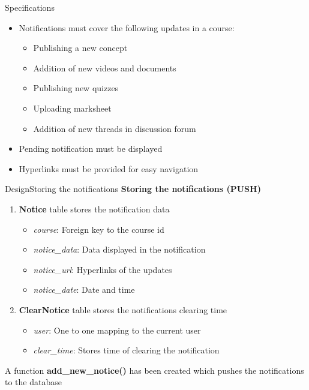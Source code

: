 \documentclass[xcolor=table]{beamer}
\begin{document}
\begin{frame}{Specifications}
	\begin{itemize}
		\item Notifications must cover the following updates in a course:
		\begin{itemize}
			\item Publishing a new concept
			\item Addition of new videos and documents
			\item Publishing new quizzes
			\item Uploading marksheet
			\item Addition of new threads in discussion forum
		\end{itemize}
		\item Pending notification must be displayed
		\item Hyperlinks must be provided for easy navigation
	\end{itemize}
\end{frame}

\begin{frame}{Design}{Storing the notifications}
	\textbf{Storing the notifications (PUSH)}
	\begin{enumerate}
		\item \textbf{Notice} table stores the notification data
		\begin{itemize}
			\item \textit{course}: Foreign key to the course id
			\item \textit{notice\_data}: Data displayed in the notification
			\item \textit{notice\_url}: Hyperlinks of the updates
			\item \textit{notice\_date}: Date and time
		\end{itemize}
		\item \textbf{ClearNotice} table stores the notifications clearing time
		\begin{itemize}
			\item \textit{user}: One to one mapping to the current user
			\item \textit{clear\_time}: Stores time of clearing the notification
		\end{itemize}
	\end{enumerate}
	\vspace{0.2in}
	A function \textbf{add\_new\_notice()} has been created which pushes the notifications to the database
\end{frame}
\end{document}
